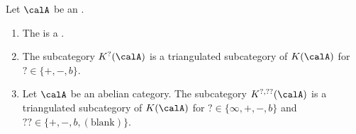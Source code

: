 \begin{proposition} \label{proposition:homotopy_category_of_an_additive_category_is_a_triangulated_category}
    Let $\calA$ be an . 
    \begin{enumerate}
        \item The  is a .
        \item The subcategory $K^?(\calA)$ is a triangulated subcategory of $K(\calA)$ for $? \in \{+,-,b\}$.
        \item Let $\calA$ be an abelian category. The subcategory $K^{?,??}(\calA)$ is a triangulated subcategory of $K(\calA)$ for $? \in \{\infty,+,-,b\}$ and $?? \in \{+,-,b,(\text{blank})\}$.
    \end{enumerate}
\end{proposition}